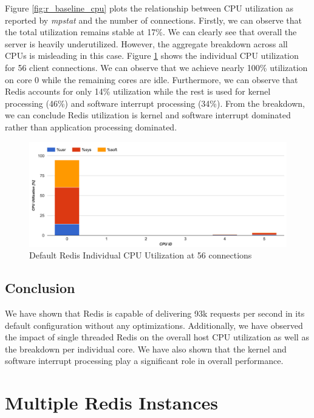 Figure \ref{fig:r_baseline_cpu} plots the relationship between CPU utilization as reported by \textit{mpstat} and the number of connections. Firstly, we can observe that the total utilization remains stable at 17\%. We can clearly see that overall the server is heavily underutilized. However, the aggregate breakdown across all CPUs is misleading in this case. Figure \ref{fig:r_baseline_cpu_individual} shows the individual CPU utilization for 56 client connections. We can observe that we achieve nearly 100\% utilization on core 0 while the remaining cores are idle. Furthermore, we can observe that Redis accounts for only 14\% utilization while the rest is used for kernel processing (46\%) and software interrupt processing (34\%). From the breakdown, we can conclude Redis utilization is kernel and software interrupt dominated rather than application processing dominated.

\begin{figure}[h]
    \includegraphics[width=\textwidth]{./res2/r_baseline_cpu_individual.png}
    \caption{Default Redis Individual CPU Utilization at 56 connections}
    \label{fig:r_baseline_cpu_individual}
\end{figure}

\subsection{Conclusion}
We have shown that Redis is capable of delivering 93k requests per second in its default configuration without any optimizations. Additionally, we have observed the impact of single threaded Redis on the overall host CPU utilization as well as the breakdown per individual core. We have also shown that the kernel and software interrupt processing play a significant role in overall performance.


\section{Multiple Redis Instances}
\label{sec:multiple-redis-instances}

